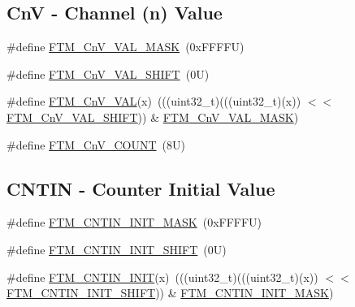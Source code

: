 \subsection*{CnV -\/ Channel (n) Value}
\begin{DoxyCompactItemize}
\item 
\#define \mbox{\hyperlink{group___f_t_m___register___masks_gaebf50ac59c7cc0b853a2a90b117ac395}{F\+T\+M\+\_\+\+Cn\+V\+\_\+\+V\+A\+L\+\_\+\+M\+A\+SK}}~(0x\+F\+F\+F\+F\+U)
\item 
\#define \mbox{\hyperlink{group___f_t_m___register___masks_ga763735cc078e7480124e33026ff2fa22}{F\+T\+M\+\_\+\+Cn\+V\+\_\+\+V\+A\+L\+\_\+\+S\+H\+I\+FT}}~(0\+U)
\item 
\#define \mbox{\hyperlink{group___f_t_m___register___masks_gaee6cacf155d736fa3c12612eae539dca}{F\+T\+M\+\_\+\+Cn\+V\+\_\+\+V\+AL}}(x)~(((uint32\+\_\+t)(((uint32\+\_\+t)(x)) $<$$<$ \mbox{\hyperlink{group___f_t_m___register___masks_ga763735cc078e7480124e33026ff2fa22}{F\+T\+M\+\_\+\+Cn\+V\+\_\+\+V\+A\+L\+\_\+\+S\+H\+I\+FT}})) \& \mbox{\hyperlink{group___f_t_m___register___masks_gaebf50ac59c7cc0b853a2a90b117ac395}{F\+T\+M\+\_\+\+Cn\+V\+\_\+\+V\+A\+L\+\_\+\+M\+A\+SK}})
\item 
\#define \mbox{\hyperlink{group___f_t_m___register___masks_ga64aff5e0f4b2a097e6bda22fd62c2cad}{F\+T\+M\+\_\+\+Cn\+V\+\_\+\+C\+O\+U\+NT}}~(8\+U)
\end{DoxyCompactItemize}
\subsection*{C\+N\+T\+IN -\/ Counter Initial Value}
\begin{DoxyCompactItemize}
\item 
\#define \mbox{\hyperlink{group___f_t_m___register___masks_ga5181f522d645ce312209c2258a1a06d0}{F\+T\+M\+\_\+\+C\+N\+T\+I\+N\+\_\+\+I\+N\+I\+T\+\_\+\+M\+A\+SK}}~(0x\+F\+F\+F\+F\+U)
\item 
\#define \mbox{\hyperlink{group___f_t_m___register___masks_ga174caa0423e0d00ae66b8adc3253ce60}{F\+T\+M\+\_\+\+C\+N\+T\+I\+N\+\_\+\+I\+N\+I\+T\+\_\+\+S\+H\+I\+FT}}~(0\+U)
\item 
\#define \mbox{\hyperlink{group___f_t_m___register___masks_gac20c0ad9416a41d291b1fed2313da2ea}{F\+T\+M\+\_\+\+C\+N\+T\+I\+N\+\_\+\+I\+N\+IT}}(x)~(((uint32\+\_\+t)(((uint32\+\_\+t)(x)) $<$$<$ \mbox{\hyperlink{group___f_t_m___register___masks_ga174caa0423e0d00ae66b8adc3253ce60}{F\+T\+M\+\_\+\+C\+N\+T\+I\+N\+\_\+\+I\+N\+I\+T\+\_\+\+S\+H\+I\+FT}})) \& \mbox{\hyperlink{group___f_t_m___register___masks_ga5181f522d645ce312209c2258a1a06d0}{F\+T\+M\+\_\+\+C\+N\+T\+I\+N\+\_\+\+I\+N\+I\+T\+\_\+\+M\+A\+SK}})
\end{DoxyCompactItemize}
